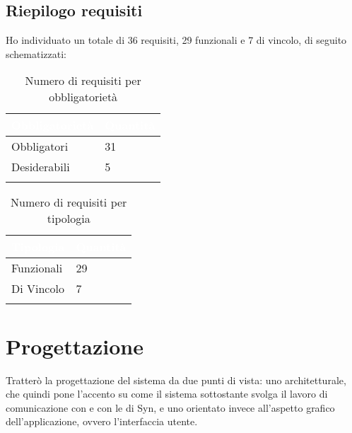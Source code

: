 \subsection{Riepilogo requisiti}
Ho individuato un totale di 36 requisiti, 29 funzionali e 7 di vincolo, di seguito schematizzati:
{
    \setlength{\freewidth}{\dimexpr\textwidth-10\tabcolsep}
    \renewcommand{\arraystretch}{1.5}
    \centering
    \setlength{\aboverulesep}{0pt}
    \setlength{\belowrulesep}{0pt}
    \begin{longtable}{C{.25\freewidth} C{.2\freewidth}} 
       \toprule
    \textcolor{white}{\textbf{Obbligatorietà}}&
    \textcolor{white}{\textbf{Quantità}}\\
    \toprule
    \endhead

    Obbligatori & 31\\
    Desiderabili & 5\\
    \bottomrule
    \caption{Numero di requisiti per obbligatorietà}
    \end{longtable}
}

{
    \setlength{\freewidth}{\dimexpr\textwidth-10\tabcolsep}
    \renewcommand{\arraystretch}{1.5}
    \centering
    \setlength{\aboverulesep}{0pt}
    \setlength{\belowrulesep}{0pt}
    \begin{longtable}{C{.25\freewidth} C{.2\freewidth}} 
       \toprule
    \textcolor{white}{\textbf{Tipologia}}&
    \textcolor{white}{\textbf{Quantità}}\\
    \toprule
    \endhead

    Funzionali & 29\\
    Di Vincolo & 7\\
    \bottomrule
    \caption{Numero di requisiti per tipologia}
    \end{longtable}
}



\section{Progettazione}
Tratterò la progettazione del sistema da due punti di vista: uno architetturale, che quindi pone l'accento su come il sistema sottostante svolga il lavoro di comunicazione con \asa{} e con le \api{} di Syn, e uno orientato invece all'aspetto grafico dell'applicazione, ovvero l'interfaccia utente.

